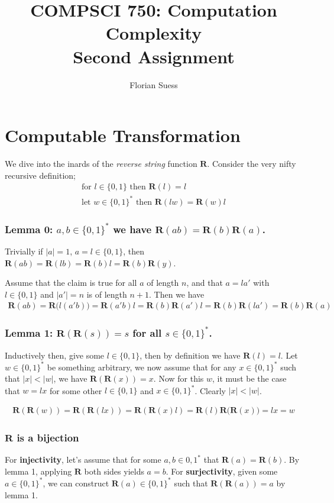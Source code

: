\documentclass{article}
\title{COMPSCI 750: Computation Complexity \\ Second Assignment}
\author{Florian Suess}
\begin{document}
\maketitle

\section*{Computable Transformation}
We dive into the inards of the \emph{reverse string} function $\bm{R}$. Consider the very nifty recursive definition;
\begin{align*}
	\text{for } l \in \{0,1\} \text{ then } \bm{R}(l) = l \\
	\text{let } w \in \{0,1\}^* \text{ then } \bm{R}(lw) = \bm{R}(w)l
\end{align*}

\subsubsection*{Lemma 0: $a,b \in \{0,1\}^*$ we have $\bm{R}(ab) = \bm{R}(b)\bm{R}(a)$.}
Trivially if $|a|=1$, $a=l\in \{0,1\}$, then $\bm{R}(ab)=\bm{R}(lb)=\bm{R}(b)l=\bm{R}(b)\bm{R}(y)$.

Assume that the claim is true for all $a$ of length $n$, and that $a=la'$ with $l\in \{0,1\}$ and $|a'|=n$ is of length $n+1$. Then we have
\begin{align*}
	\bm{R}(ab)=\bm{R}\bigl(l(a'b)\bigr)=\bm{R}(a'b)l=\bm{R}(b)\bm{R}(a')l=\bm{R}(b)\bm{R}(la')=\bm{R}(b)\bm{R}(a)
\end{align*}

\subsubsection*{Lemma 1: $\bm{R}(\bm{R}(s)) = s$ for all $s \in \{0,1\}^*$.}
Inductively then, give some $l \in \{0,1\}$, then by definition we have $\bm{R}(l) = l$. Let $w \in \{0,1\}^*$ be something arbitrary, we now assume that for any $x \in \{0,1\}^*$ such that $|x| < |w|$, we have $\bm{R}(\bm{R}(x)) = x$. Now for this $w$, it must be the case that $w = lx$ for some other $l \in \{0,1\}$ and $x \in \{0,1\}^*$. Clearly $|x| < |w|$.

\begin{align*}
	\bm{R}(\bm{R}(w)) = \bm{R}(\bm{R}(lx)) = \bm{R}(\bm{R}(x)l) = \bm{R}(l)\bm{R}\bigl(\bm{R}(x)\bigr) = lx = w
\end{align*}

\subsubsection*{$\bm{R}$ is a bijection}
For \textbf{injectivity}, let's assume that for some $a,b \in {0,1}^*$ that $\bm{R}(a) = \bm{R}(b)$. By lemma 1, applying $\bm{R}$ both sides yields $a = b$. For \textbf{surjectivity}, given some $a \in \{0,1\}^*$, we can construct $\bm{R}(a) \in \{0,1\}^*$ such that $\bm{R}(\bm{R}(a)) = a$ by lemma 1.
\end{document}
